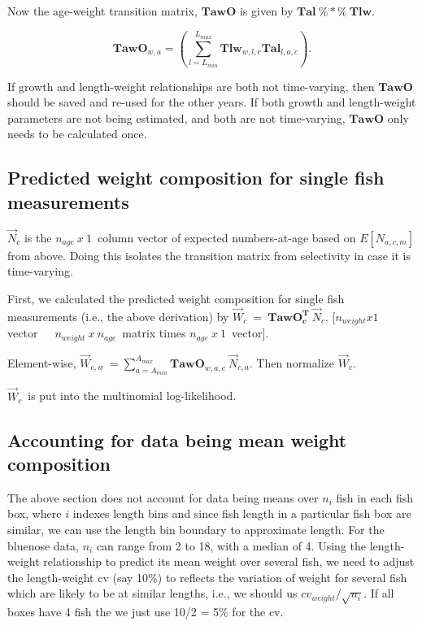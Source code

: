 \documentclass[a4paper,11pt,twoside,pdftex,draft]{article}
\begin{document}
Now the age-weight transition matrix, $\mathbf{TawO}$ is given by $\mathbf{Tal} \ \%*\%\ \mathbf{Tlw} $.

\begin{equation}
\mathbf{TawO}_{w,a} = \left( \sum_{l=L_{min}}^{L_{max}}  \mathbf{Tlw}_{w,l,c}  \mathbf{Tal}_{l,a,c}\right).
\end{equation}

If growth and length-weight relationships are both not time-varying, then $\mathbf{TawO}$ should be saved and re-used for the other years. If both growth and length-weight parameters are not being estimated, and both are not time-varying, $\mathbf{TawO}$ only needs to be calculated once.


\subsection{Predicted weight composition for single fish measurements}

$\overrightarrow N_{c}$ is the $n_{age}\ x\ 1$\ column vector of expected numbers-at-age based on $E[N_{a,c,m}]$ from above. Doing this isolates the transition matrix from selectivity in case it is time-varying.

First, we calculated the predicted weight composition for single fish measurements (i.e., the above derivation) by $\overrightarrow W_{c}\ =\ \mathbf{TawO_{c}^T}\ \overrightarrow N_{c}$.
[$n_{weight}x1$ vector\ \ \ $n_{weight}\ x\ n_{age}$\ matrix times $n_{age}\ x\ 1$\ vector]. 

Element-wise, $\overrightarrow W_{c,w}\ = \sum_{a=A_{min}}^{A_{max}}  \mathbf{TawO}_{w,a,c}  \ \overrightarrow N_{c,a}$.
Then normalize $\overrightarrow W_{c}$.

$\overrightarrow W_{c}$\ is put into the multinomial log-likelihood. 


\subsection{Accounting for data being mean weight composition}

The above section does not account for data being means over $n_i$ fish in each fish box, where $i$ indexes length bins and since fish length  in a particular fish box are similar, we can use the length bin boundary to approximate length. For the bluenose data, $n_i$ can range from 2 to 18, with a median of 4. 
Using the length-weight relationship to predict its mean weight over several fish, we need to adjust the 
 length-weight cv (say 10\%) to reflects the variation of weight for several fish which are likely to be at similar lengths, i.e., we should us $cv_{weight}/\sqrt{n_{i}}$. If all boxes have 4 fish the we just use 10/2 = 5\% for the cv.
\end{document}
